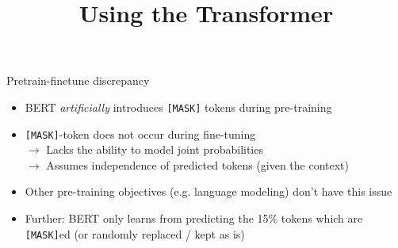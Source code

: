 



\newcommand{\titlefigure}{figure/bert.jpeg}
\newcommand{\learninggoals}{
\item Problem with the [MASK] token
\item Inter-token dependencies
\item Get aware of biases}

\title{Using the Transformer}
\date{}




\begin{frame}{Pretrain-finetune discrepancy}

\vfill

	\begin{itemize}
		\item BERT \textit{artificially} introduces \texttt{[MASK]} tokens during pre-training
		\item \texttt{[MASK]}-token does not occur during fine-tuning\\
					$\rightarrow$ Lacks the ability to model joint probabilities\\
					$\rightarrow$ Assumes independence of predicted tokens (given the context)
		\item Other pre-training objectives (e.g. language modeling) don't have this issue
		\item Further: BERT only learns from predicting the 15\% tokens which are \texttt{[MASK]}ed (or randomly replaced / kept as is)
	\end{itemize}

\vfill

\end{frame}


